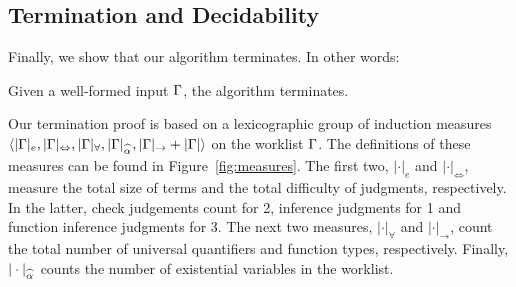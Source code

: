 \subsection{Termination and Decidability}

Finally, we show that our algorithm terminates. In other words:
\begin{theorem}[Termination]
Given a well-formed input $\Gamma$, the algorithm terminates.
\end{theorem}
Our termination proof is based on a lexicographic group of induction measures\\
$\langle |\Gm|_e, |\Gm|_\Leftrightarrow, |\Gm|_\forall, |\Gm|_{\al}, |\Gm|_\to + |\Gm| \rangle$
on the worklist $\Gamma$. The definitions of these measures can be found in Figure~\ref{fig:measures}. The first two, 
$|\cdot|_e$ and $|\cdot|_\Leftrightarrow$, measure the total size of terms
and the total difficulty of judgments, respectively. In the latter, check judgements
count for 2, inference judgments for 1 and function inference judgments for 3.
The next two measures, $|\cdot|_\forall$ and $|\cdot|_\to$, count the total number of
universal quantifiers and function types, respectively. Finally,
$|\cdot|_{\al}$ counts the number of existential variables in the worklist.

